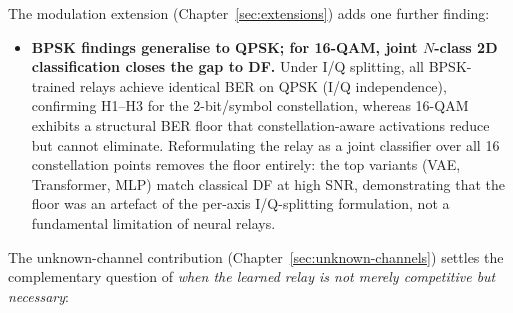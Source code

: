 The modulation extension (Chapter~\ref{sec:extensions}) adds one further finding:

\begin{itemize}
\tightlist
\item
  \textbf{BPSK findings generalise to QPSK; for 16-QAM, joint $N$-class 2D classification closes the gap to DF.} Under I/Q splitting, all BPSK-trained relays achieve identical BER on QPSK (I/Q independence), confirming H1--H3 for the 2-bit/symbol constellation, whereas 16-QAM exhibits a structural BER floor that constellation-aware activations reduce but cannot eliminate. Reformulating the relay as a joint classifier over all 16 constellation points removes the floor entirely: the top variants (VAE, Transformer, MLP) match classical DF at high SNR, demonstrating that the floor was an artefact of the per-axis I/Q-splitting formulation, not a fundamental limitation of neural relays.
\end{itemize}

The unknown-channel contribution (Chapter~\ref{sec:unknown-channels}) settles the complementary question of \emph{when the learned relay is not merely competitive but necessary}:

